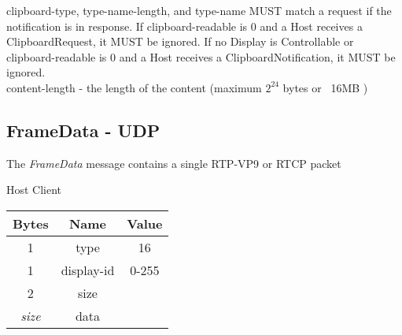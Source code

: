 clipboard-type, type-name-length, and type-name MUST match a request if the notification is in response. If
clipboard-readable is 0 and a Host receives a ClipboardRequest, it MUST be ignored. If no Display is Controllable or
clipboard-readable is 0 and a Host receives a ClipboardNotification, it MUST be ignored.\\

content-length -  the length of the content  (maximum $2^{24}$ bytes or ~16MB )\\

\subsection{FrameData - UDP}

The \emph{FrameData} message contains a single RTP-VP9 or RTCP packet

\begin{center}
    Host \textrightarrow Client\\
    \begin{tabular}{|c|c|c|}
        \hline
        \textbf{Bytes} & \textbf{Name} & \textbf{Value} \\
        \hline
        1              & type          & 16             \\
        \hline
        1              & display-id    & 0-255          \\
        \hline
        2              & size          &                \\
        \hline
        \emph{size}    & data          &                \\
        \hline
    \end{tabular}
\end{center}